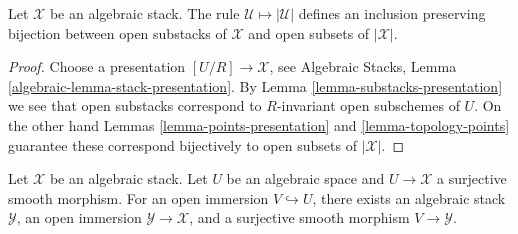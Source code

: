 \begin{lemma}
\label{lemma-open-substacks}
Let $\mathcal{X}$ be an algebraic stack. The rule
$\mathcal{U} \mapsto |\mathcal{U}|$ defines an inclusion preserving
bijection between open substacks of $\mathcal{X}$ and open subsets
of $|\mathcal{X}|$.
\end{lemma}

\begin{proof}
Choose a presentation $[U/R] \to \mathcal{X}$, see
Algebraic Stacks, Lemma \ref{algebraic-lemma-stack-presentation}.
By
Lemma \ref{lemma-substacks-presentation}
we see that open substacks correspond to $R$-invariant open subschemes
of $U$. On the other hand
Lemmas \ref{lemma-points-presentation} and \ref{lemma-topology-points}
guarantee these correspond bijectively to open subsets of $|\mathcal{X}|$.
\end{proof}

\begin{lemma}
\label{lemma-open-image-substack}
Let $\mathcal X$ be an algebraic stack. Let $U$ be an algebraic space and
$U \to \mathcal X$ a surjective smooth morphism. For an open immersion
$V \hookrightarrow U$, there exists an algebraic stack $\mathcal Y$, an
open immersion $\mathcal Y \to \mathcal X$, and a surjective smooth
morphism $V \to \mathcal Y$.
\end{lemma}

